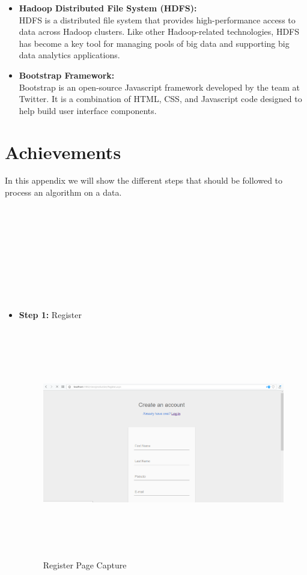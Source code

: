 \begin{appendix}
\begin{itemize}
\begin{itemize}
\item \textbf{Hadoop Distributed File System (HDFS):}\\
HDFS is a distributed file system that provides high-performance access to data across Hadoop clusters. Like other Hadoop-related technologies, HDFS has become a key tool for managing pools of big data and supporting big data analytics applications.
\item \textbf{Bootstrap Framework:}\\
Bootstrap is an open-source Javascript framework developed by the team at Twitter. It is a combination of HTML, CSS, and Javascript code designed to help build user interface components.
\end{itemize}
\end{itemize}





\chapter{Achievements}
\label{achievement}
In this appendix we will show the different steps that should be followed to process an algorithm on a data.

~\\
~\\
~\\
~\\
~\\
~\\
~\\
~\\
\begin{itemize}
\item \textbf{Step 1:} Register\\

\begin{figure}[!ht]
\begin{center}
\includegraphics[width=17cm,height=10cm]{chapter5/register.png}
\end{center}
\caption{Register Page Capture}
\label{register}
\end{figure} 


\end{itemize}
\end{appendix}
